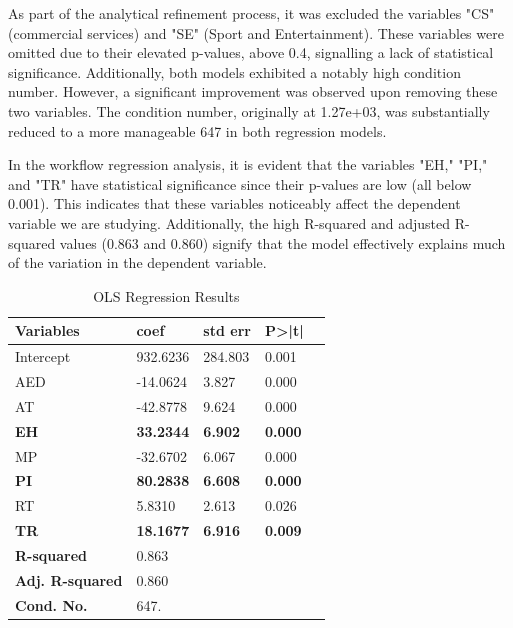        As part of the analytical refinement process, it was excluded the variables "CS" (commercial services) and "SE" (Sport and Entertainment). These variables were omitted due to their elevated p-values, above 0.4, signalling a lack of statistical significance. Additionally, both models exhibited a notably high condition number. However, a significant improvement was observed upon removing these two variables. The condition number, originally at 1.27e+03, was substantially reduced to a more manageable 647 in both regression models. 

        In the workflow regression analysis, it is evident that the variables "EH," "PI," and "TR" have statistical significance since their p-values are low (all below 0.001). This indicates that these variables noticeably affect the dependent variable we are studying. Additionally, the high R-squared and adjusted R-squared values (0.863 and 0.860) signify that the model effectively explains much of the variation in the dependent variable.

\begin{table}[H]
\centering
\begin{tabular}{@{}lllll@{}}
\toprule
\textbf{Variables} & \textbf{coef} & \textbf{std err} & \textbf{P>|t|} \\ \midrule
Intercept & 932.6236 & 284.803 & 0.001 \\
AED & -14.0624 & 3.827 & 0.000 \\
AT & -42.8778 & 9.624 & 0.000 \\
\color[HTML]{9A0000} \textbf{EH} & \color[HTML]{9A0000} \textbf{33.2344} & \color[HTML]{9A0000} \textbf{6.902} & \color[HTML]{9A0000} \textbf{0.000} \\
MP & -32.6702 & 6.067 & 0.000 \\
\color[HTML]{9A0000} \textbf{PI} & \color[HTML]{9A0000} \textbf{80.2838} & \color[HTML]{9A0000} \textbf{6.608} & \color[HTML]{9A0000} \textbf{0.000} \\
RT & 5.8310 & 2.613 & 0.026 \\
\color[HTML]{9A0000} \textbf{TR} & \color[HTML]{9A0000} \textbf{18.1677} & \color[HTML]{9A0000} \textbf{6.916} & \color[HTML]{9A0000} \textbf{0.009} \\ \bottomrule
\textbf{R-squared} & 0.863 \\
\textbf{Adj. R-squared} & 0.860 \\
\textbf{Cond. No.} & 647. \\ \bottomrule
\hline
\end{tabular}
\caption{OLS Regression Results}
\label{tab:ols-results}
\end{table}


